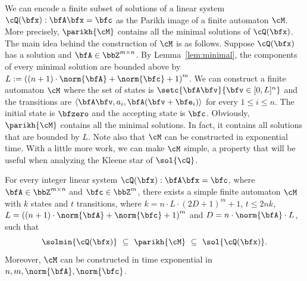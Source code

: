 We can encode a finite subset of solutions of a linear system $\cQ(\bfx):\bfA \bfx = \bfc$ as the Parikh image of a finite automaton $\cM$.
More precisely, $\parikh{\cM}$ contains all the minimal solutions of $\cQ(\bfx)$.
The main idea behind the construction of $\cM$ is as follows.
Suppose $\cQ(\bfx)$ has a solution
and $\bfA\in \bbZ^{m\times n}$.
By Lemma~\ref{lem:minimal},
the components of every minimal solution are bounded above by  
$L:=\left((n+1)\cdot\norm{\bfA} + \norm{\bfc} + 1\right)^{m}$.
We can construct a finite automaton $\cM$ where the set of states is $\setc{\bfA\bfv}{\bfv \in [0,L]^n}$
and the transitions are
$\langle \bfA\bfv,a_i, \bfA(\bfv+\bfe_i) \rangle$ for every $1\le i \le n$.
The initial state is $\bfzero$ and the accepting state is $\bfc$.
Obviously, $\parikh{\cM}$ contains all the minimal solutions. In fact, it contains all solutions that are bounded by $L$. 
Note also that
$\cM$ can be constructed in exponential time.
With a little more work, we can make $\cM$ simple, a property that will be useful when analyzing the Kleene star of $\sol{\cQ}$.

\begin{lemma}\label{lem:ilp_to_nfa}
For every integer linear system $\cQ(\bfx): \bfA \bfx = \bfc$,
where $\bfA \in \bbZ^{m \times n}$ and $\bfc \in \bbZ^{m}$,
there exists a simple finite automaton $\cM$
with $k$ states and $t$ transitions,
where $k = n\cdot L\cdot(2D+1)^{m} + 1$, 
$t \le 2nk$,
$L = \left((n+1)\cdot\norm{\bfA} + \norm{\bfc} + 1\right)^{m}$
and $D = n \cdot \norm{\bfA} \cdot L$,
    such that
    \begin{equation*}
        \solmin{\cQ(\bfx)}
        \ \subseteq\ 
        \parikh{\cM}
        \ \subseteq\ 
        \sol{\cQ(\bfx)}.
    \end{equation*}
    Moreover, $\cM$ can be constructed in time exponential in $n,m,\norm{\bfA},\norm{\bfc}$.
\end{lemma}

